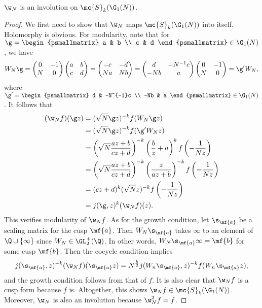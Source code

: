     \begin{proposition}\label{prop:Atkin_Lehner_holomorphic}
      $\w_{N}$ is an involution on $\mc{S}_{k}(\G_{1}(N))$.
    \end{proposition}
    \begin{proof}
      We first need to show that $\w_{N}$ maps $\mc{S}_{k}(\G_{1}(N))$ into itself. Holomorphy is obvious. For modularity, note that for $\g = \begin{psmallmatrix} a & b \\ c & d \end{psmallmatrix} \in \G_{1}(N)$, we have
      \[
        W_{N}\g = \begin{pmatrix} 0 & -1 \\ N & 0 \end{pmatrix}\begin{pmatrix} a & b \\ c & d \end{pmatrix} = \begin{pmatrix} -c & -d \\ Na & Nb \\ \end{pmatrix} = \begin{pmatrix} d & -N^{-1}c \\ -Nb & a \end{pmatrix}\begin{pmatrix} 0 & -1 \\ N & 0 \end{pmatrix} = \g'W_{N},
      \]
      where $\g' = \begin{psmallmatrix} d & -N^{-1}c \\ -Nb & a \end{psmallmatrix} \in \G_{1}(N)$. It follows that
      \begin{align*}
        (\w_{N}f)(\g z) &= (\sqrt{N}\g z)^{-k}f(W_{N}\g z) \\
        &= (\sqrt{N}\g z)^{-k}f(\g'W_{N}z) \\
        &= \left(\sqrt{N}\frac{az+b}{cz+d}\right)^{-k}\left(\frac{b}{z}+a\right)^{k}f\left(-\frac{1}{Nz}\right) \\
        &= \left(\sqrt{N}\frac{az+b}{cz+d}\right)^{-k}\left(\frac{z}{az+b}\right)^{-k}f\left(-\frac{1}{Nz}\right) \\
        &= (cz+d)^{k}(\sqrt{N}z)^{-k}f\left(-\frac{1}{Nz}\right) \\
        &= j(\g,z)^{k}(\w_{N}f)(z).
      \end{align*}
      This verifies modularity of $\w_{N}f$. As for the growth condition, let $\s_{\mf{a}}$ be a scaling matrix for the cusp $\mf{a}$. Then $W_{N}\s_{\mf{a}}$ takes $\infty$ to an element of $\Q \cup \{\infty\}$ since $W_{N} \in \GL_{2}^{+}(\Q)$. In other words, $W_{N}\s_{\mf{a}}\infty = \mf{b}$ for some cusp $\mf{b}$. Then the cocycle condition implies
      \[
        j(\s_{\mf{a}},z)^{-k}(\w_{N}f)(\s_{\mf{a}}z) = N^{\frac{k}{2}}j(W_{n}\s_{\mf{a}},z)^{-k}f(W_{n}\s_{\mf{a}}z),
      \]
      and the growth condition follows from that of $f$. It is also clear that $\w_{N}f$ is a cusp form because $f$ is. Altogether, this shows $\w_{N}f \in \mc{S}_{k}(\G_{1}(N))$. Moreover, $\w_{N}$ is also an involution because $\w_{N}^{2}f = f$. 
    \end{proof}

